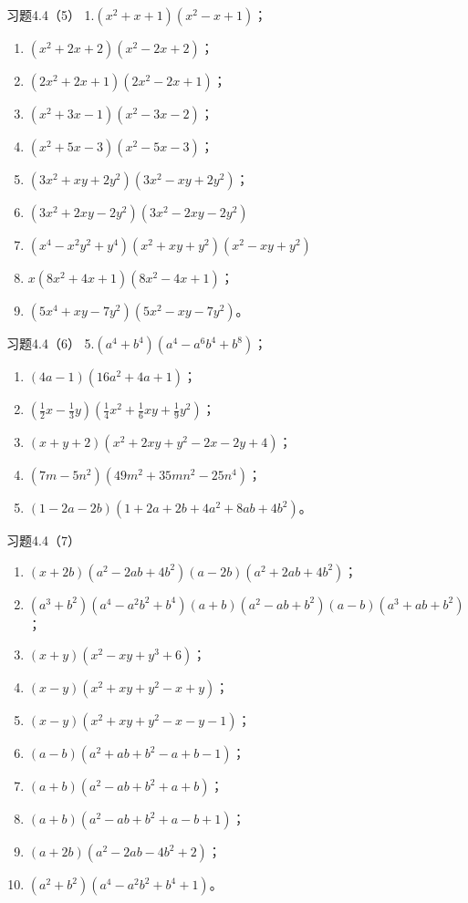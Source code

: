 习题4.4（5） 1.\((x^{2} + x + 1)(x^{2} - x + 1)\)；
\begin{enumerate}[start=2]
\item
  \((x^{2} + 2x + 2)(x^{2} - 2x + 2)\)；
\item
  \((2x^{2} + 2x + 1)(2x^{2} - 2x + 1)\)；
\item
  \((x^{2} + 3x - 1)(x^{2} - 3x - 2)\)；
\item
  \((x^{2} + 5x - 3)(x^{2} - 5x - 3)\)；
\item
  \((3x^{2} + xy + 2y^{2})(3x^{2} - xy + 2y^{2})\)；
\item
  \((3x^{2} + 2xy - 2y^{2})(3x^{2} - 2xy - 2y^{2})\)
\item
  \((x^{4} - x^{2}y^{2} + y^{4})(x^{2} + xy + y^{2})(x^{2} - xy + y^{2})\)
\item
  \(x(8x^{2} + 4x + 1)(8x^{2} - 4x + 1)\)；
\item
  \((5x^{4} + xy - 7y^{2})(5x^{2} - xy - 7y^{2})\)。
\end{enumerate}

习题4.4（6） 5.\((a^4 + b^4)(a^4 - a^6b^4 + b^8)\)；
\begin{enumerate}[start=6]
\item
  \((4a - 1)(16a^2 + 4a + 1)\)；
\item
  \(\left(\frac{1}{2} x - \frac{1}{3} y\right)\left(\frac{1}{4} x^2 + \frac{1}{6} xy + \frac{1}{9} y^2\right)\)；
\item
  \((x + y + 2)(x^2 + 2xy + y^2 - 2x - 2y + 4)\)；
\item
  \((7m - 5n^2)(49m^2 + 35mn^2 - 25n^4)\)；
\item
  \((1 - 2a - 2b)(1 + 2a + 2b + 4a^2 + 8ab + 4b^2)\)。
\end{enumerate}

习题4.4（7）
\begin{enumerate}[start=1]
\item
  \((x + 2b)(a^2 - 2ab + 4b^2)(a - 2b)(a^2 + 2ab + 4b^2)\)；
\item
  \((a^3 + b^2)(a^4 - a^2b^2 + b^4)(a + b)(a^2 - ab + b^2)(a - b)(a^3 + ab + b^2)\)；
\item
  \((x + y)(x^2 - xy + y^3 + 6)\)；
\item
  \((x - y)(x^2 + xy + y^2 - x + y)\)；
\item
  \((x - y)(x^2 + xy + y^2 - x - y - 1)\)；
\item
  \((a - b)(a^2 + ab + b^2 - a + b - 1)\)；
\item
  \((a + b)(a^2 - a b + b^2 + a + b)\)；
\item
  \((a + b)(a^2 - a b + b^2 + a - b + 1)\)；
\item
  \((a + 2b)(a^2 - 2ab - 4b^2 + 2)\)；
\item
  \((a^2 + b^2)(a^4 - a^2b^2 + b^4 + 1)\)。
\end{enumerate}

